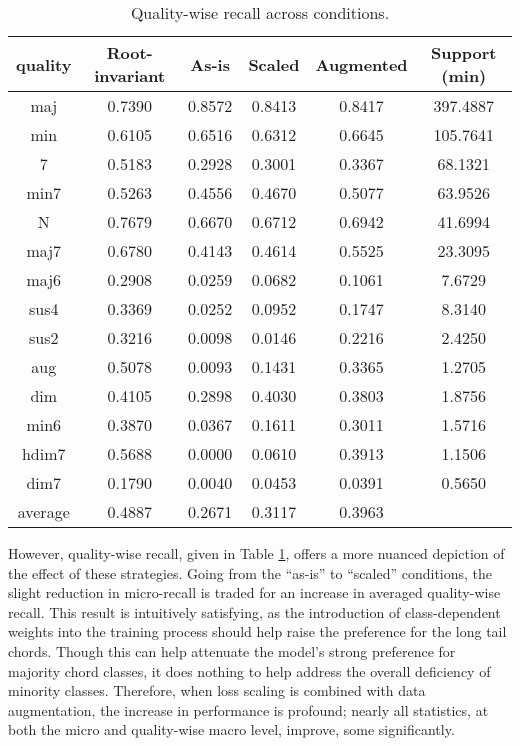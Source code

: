 \begin{table}[t]
\begin{center}
\scriptsize
\caption{Quality-wise recall across conditions.}
\label{tab:test_qualitywise}
\begin{tabular}{c|c|ccc|c}

 quality   &  Root-invariant &  As-is & Scaled & Augmented & Support (min) \\
\hline
 maj       &  0.7390 &  0.8572 &  0.8413 &  0.8417 &  397.4887 \\
 min       &  0.6105 &  0.6516 &  0.6312 &  0.6645 &  105.7641 \\
 7         &  0.5183 &  0.2928 &  0.3001 &  0.3367 &   68.1321 \\
 min7      &  0.5263 &  0.4556 &  0.4670 &  0.5077 &   63.9526 \\
 N         &  0.7679 &  0.6670 &  0.6712 &  0.6942 &   41.6994 \\
 maj7      &  0.6780 &  0.4143 &  0.4614 &  0.5525 &   23.3095 \\
 \hline
 maj6      &  0.2908 &  0.0259 &  0.0682 &  0.1061 &    7.6729 \\
 sus4      &  0.3369 &  0.0252 &  0.0952 &  0.1747 &    8.3140 \\
 sus2      &  0.3216 &  0.0098 &  0.0146 &  0.2216 &    2.4250 \\
 aug       &  0.5078 &  0.0093 &  0.1431 &  0.3365 &    1.2705 \\
 dim       &  0.4105 &  0.2898 &  0.4030 &  0.3803 &    1.8756 \\
 min6      &  0.3870 &  0.0367 &  0.1611 &  0.3011 &    1.5716 \\
 hdim7     &  0.5688 &  0.0000 &  0.0610 &  0.3913 &    1.1506 \\
 dim7      &  0.1790 &  0.0040 &  0.0453 &  0.0391 &    0.5650 \\
 \hline
 average   &  0.4887 &  0.2671 &  0.3117 &  0.3963 &  \\
\hline
\end{tabular}
\end{center}
\end{table}

However, quality-wise recall, given in Table \ref{tab:test_qualitywise}, offers a more nuanced depiction of the effect of these strategies.
Going from the ``as-is'' to ``scaled'' conditions, the slight reduction in micro-recall is traded for an increase in averaged quality-wise recall.
This result is intuitively satisfying, as the introduction of class-dependent weights into the training process should help raise the preference for the long tail chords.
Though this can help attenuate the model's strong preference for majority chord classes, it does nothing to help address the overall deficiency of minority classes.
Therefore, when loss scaling is combined with data augmentation, the increase in performance is profound; nearly all statistics, at both the micro and quality-wise macro level, improve, some significantly.


